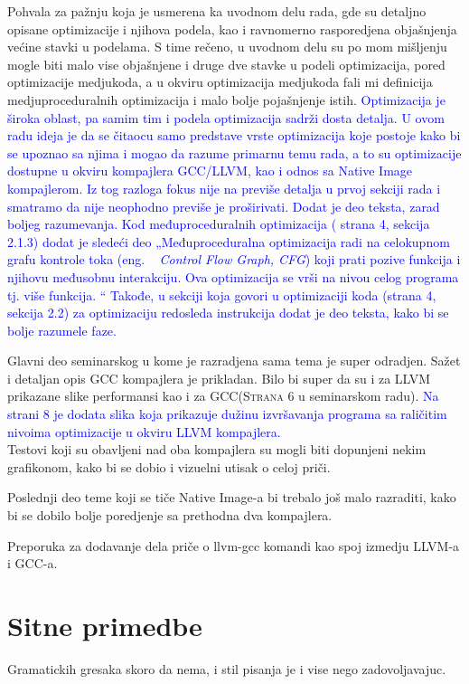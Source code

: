 \documentclass[a4paper]{report}
\newcommand{\odgovor}[1]{\textcolor{blue}{#1}}
\begin{document}
Pohvala za pažnju koja je usmerena ka uvodnom delu rada, gde su detaljno opisane optimizacije i njihova podela, kao i ravnomerno rasporedjena objašnjenja većine stavki u podelama. S time rečeno, u uvodnom delu su po mom mišljenju mogle biti malo vise objašnjene i druge dve stavke u podeli optimizacija, pored optimizacije medjukoda, a u okviru optimizacija medjukoda fali mi definicija medjuproceduralnih optimizacija i malo bolje pojašnjenje istih. 
\odgovor{ Optimizacija je široka oblast, pa samim tim i podela optimizacija sadrži dosta detalja. U ovom radu ideja je da se čitaocu samo predstave vrste optimizacija koje postoje kako bi se 
          upoznao sa njima i mogao da razume primarnu temu rada, a to su optimizacije dostupne u okviru kompajlera GCC/LLVM, kao i odnos sa Native Image kompajlerom.
          Iz tog razloga fokus nije na previše detalja u prvoj sekciji rada i smatramo da nije neophodno previše je proširivati. Dodat je deo teksta, zarad boljeg razumevanja.
          Kod međuproceduralnih optimizacija ( strana 4, sekcija 2.1.3) dodat je sledeći deo 
          „Međuproceduralna optimizacija radi na celokupnom grafu kontrole toka (eng. ~ {\em Control Flow Graph, CFG}) koji prati pozive funkcija i njihovu međusobnu interakciju. 
          Ova optimizacija se vrši na nivou celog programa tj. više funkcija. “ 
          Takođe, u sekciji koja govori u optimizaciji koda (strana 4, sekcija 2.2) za optimizaciju redosleda instrukcija dodat je deo teksta, kako bi se bolje razumele faze. 
}

Glavni deo seminarskog u kome je razradjena sama tema je super odradjen. Sažet i detaljan opis GCC kompajlera je prikladan. Bilo bi super da su i za LLVM prikazane slike performansi kao i za GCC(\textsc{Strana 6} u seminarskom radu). \odgovor{Na strani 8 je dodata slika koja prikazuje dužinu izvršavanja programa sa raličitim nivoima optimizacije u okviru LLVM kompajlera.} \\ Testovi koji su obavljeni nad oba kompajlera su mogli biti dopunjeni nekim grafikonom, kako bi se dobio i vizuelni utisak o celoj priči.

Poslednji deo teme koji se tiče Native Image-a bi trebalo još malo razraditi, kako bi se dobilo bolje poredjenje sa prethodna dva kompajlera. 

Preporuka za dodavanje dela priče o llvm-gcc komandi kao spoj izmedju LLVM-a i GCC-a.


\section{Sitne primedbe}
Gramatickih gresaka skoro da nema, i stil pisanja je i vise nego zadovoljavajuc.
\end{document}
